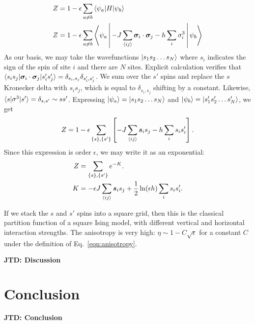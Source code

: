 \documentclass[amsmath,amssymb,aps,twocolumn,nofootinbib]{revtex4-2}
\newcommand{\brackets}[1]{\left [ #1 \right ]}
\newcommand{\jtd}[1]{{\color{red}\textbf{JTD: #1}}}
\begin{document}
\begin{equation}
  \begin{split}
    Z &= 1 - \epsilon\sum_{a\neq b}\braket{\psi_a|H|\psi_b}\\
    Z &= 1 - \epsilon\sum_{a\neq b}\Braket{\psi_a|-J\sum_{\braket{ij}}\bm \sigma_i \cdot \bm \sigma_j - h\sum_i\sigma_i^3|\psi_b}
  \end{split}
\end{equation}
As our basis, we may take the wavefunctions $\ket{s_1 s_2 \dots s_N}$ where $s_i$ indicates the sign of the spin of site $i$ and there are $N$ sites. Explicit calculation verifies that $\braket{s_is_j|\bm \sigma_i \cdot \bm \sigma_j|s_i's_j'}=\delta_{s_i,s_j}\delta_{s'_i,s'_j}$. We sum over the $s'$ spins and replace the $s$ Kronecker delta with $s_i s_j$, which is equal to $\delta_{s_i,s_j}$ shifting by a constant. Likewise, $\braket{s|\sigma^3|s'}=\delta_{s,s'}\sim ss'$. Expressing $\ket{\psi_a}=\ket{s_1 s_2 \dots s_N}$ and $\ket{\psi_b}=\ket{s'_1 s'_2 \dots s'_N}$, we get
\begin{equation}
  Z = 1 - \epsilon\sum_{\{s\},\{s'\}} \brackets{-J\sum_{\braket{ij}}\bm s_is_j - h\sum_is_i s'_i}.
\end{equation}
Since this expression is order $\epsilon$, we may write it as an exponential:
\begin{equation}
  \begin{split}
    Z &= \sum_{\{s\},\{s'\}} e^{-K}.\\
    K &= -\epsilon J\sum_{\braket{ij}}\bm s_is_j +\frac{1}{2}\ln(\epsilon h)\sum_is_i s'_i.
  \end{split}
\end{equation}

If we stack the $s$ and $s'$ spins into a square grid, then this is the classical partition function of a square Ising model, with different vertical and horizontal interaction strengths. The anisotropy is very high: $\eta \sim 1 - C\sqrt{\epsilon}$ for a constant $C$ under the definition of Eq.~\ref{eqn:anisotropy}.


\jtd{Discussion}


\section{Conclusion}
\label{sec:conclusion}

\jtd{Conclusion}


\end{document}
